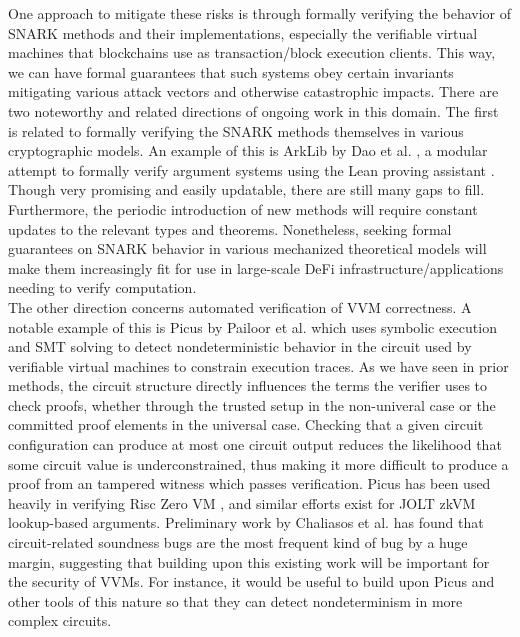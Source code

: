 \noindent One approach to mitigate these risks is through formally verifying the behavior of SNARK methods and their implementations, especially the verifiable virtual machines that blockchains use as transaction/block execution clients. This way, we can have formal guarantees that such systems obey certain invariants mitigating various attack vectors and otherwise catastrophic impacts. There are two noteworthy and related directions of ongoing work in this domain. The first is related to formally verifying the SNARK methods themselves in various cryptographic models. An example of this is ArkLib by Dao et al. \cite{arklib}, a modular attempt to formally verify argument systems using the Lean proving assistant \cite{lean4}. Though very promising and easily updatable, there are still many gaps to fill. Furthermore, the periodic introduction of new methods will require constant updates to the relevant types and theorems. Nonetheless, seeking formal guarantees on SNARK behavior in various mechanized theoretical models will make them increasingly fit for use in large-scale DeFi infrastructure/applications needing to verify computation. \\

\noindent The other direction concerns automated verification of VVM correctness. A notable example of this is Picus by Pailoor et al. \cite{picus} which uses symbolic execution and SMT solving to detect nondeterministic behavior in the circuit used by verifiable virtual machines to constrain execution traces. As we have seen in prior methods, the circuit structure directly influences the terms the verifier uses to check proofs, whether through the trusted setup in the non-univeral case or the committed proof elements in the universal case. Checking that a given circuit configuration can produce at most one circuit output reduces the likelihood that some circuit value is underconstrained, thus making it more difficult to produce a proof from an tampered witness which passes verification. Picus has been used heavily in verifying Risc Zero VM \cite{risc0}, and similar efforts exist for JOLT zkVM \cite{jolt, joltfv} lookup-based arguments. Preliminary work by Chaliasos et al. \cite{sok} has found that circuit-related soundness bugs are the most frequent kind of bug by a huge margin, suggesting that building upon this existing work will be important for the security of VVMs. For instance, it would be useful to build upon Picus and other tools of this nature so that they can detect nondeterminism in more complex circuits.

